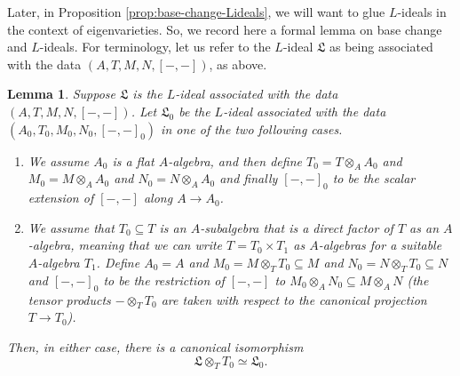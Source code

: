 \documentclass[10pt, twoside]{amsart}
\theoremstyle{plain}
\newtheorem{lemma}[theorem]{Lemma}
\theoremstyle{definition}
\theoremstyle{remark}
\numberwithin{equation}{subsection}
\def\gL{\mathfrak L}
\begin{document}
Later, in Proposition \ref{prop:base-change-Lideals}, we will want to glue $L$-ideals in the context of eigenvarieties. So, we record here a formal lemma on base change and $L$-ideals. For terminology, let us refer to the $L$-ideal $\gL$ as being associated with the data $(A,T,M,N,[-,-])$, as above.

\begin{lemma}\label{lem:base-change-lemma}
Suppose $\gL$ is the $L$-ideal associated with the data $(A,T,M,N,[-,-])$. Let $\gL_0$ be the $L$-ideal associated with the data $(A_0,T_0,M_0,N_0,[-,-]_0)$ in one of the two following cases.
\begin{enumerate}[label=(\alph*)]
\item We assume $A_0$ is a flat $A$-algebra, and then define $T_0 = T\otimes_A A_0$ and $M_0 = M\otimes_A A_0$ and $N_0 = N\otimes_A A_0$ and finally $[-,-]_0$ to be the scalar extension of $[-,-]$ along $A \rightarrow A_0$. \label{lemma-part:base-change-lemma-flat}
\item We assume that $T_0 \subseteq T$ is an $A$-subalgebra that is a direct factor of $T$ as an $A$-algebra, { meaning that we can write $T=T_0\times T_1$ as $A$-algebras for a suitable $A$-algebra $T_1$}. Define $A_0 = A$ and $M_0 = M\otimes_T T_0 \subseteq M$ and $N_0 = N\otimes_T T_0 \subseteq N$ and $[-,-]_0$ to be the restriction of $[-,-]$ to $M_0 \otimes_A N_0 \subseteq M\otimes_A N$ 
{(the tensor products $-\otimes_TT_0$ are taken with respect to the canonical projection $T\rightarrow T_0$)}.\label{lemma-part:base-change-lemma-factor}
\end{enumerate}
Then, in either case, there is a canonical isomorphism
\begin{equation*}
\gL\otimes_T T_0 \simeq \gL_0.
\end{equation*}
\end{lemma}
\end{document}
